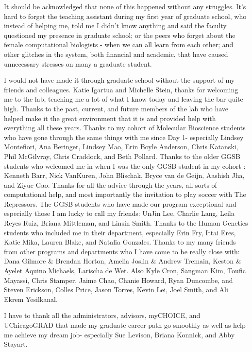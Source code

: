 It should be acknowledged that none of this happened without any struggles. It's hard to forget the teaching assistant during my first year of graduate school, who instead of helping me, told me I didn't know anything and said the faculty questioned my presence in graduate school; or the peers who forget about the female computational biologists - when we can all learn from each other; and other glitches in the system, both financial and academic, that have caused unnecessary stresses on many a graduate student.

I would not have made it through graduate school without the support of my friends and colleagues. Katie Igartua and Michelle Stein, thanks for welcoming me to the lab, teaching me a lot of what I know today and leaving the bar quite high. Thanks to the past, current, and future members of the lab who have helped make it the great environment that it is and provided help with everything all these years. Thanks to my cohort of Molecular Bioscience students who have gone through the same things with me since Day 1- especially Lindsey Montefiori, Ana Beringer, Lindsey Mao, Erin Boyle Anderson, Chris Katanski, Phil McGilvray, Chris Craddock, and Beth Pollard. Thanks to the older GGSB students who welcomed me in when I was the only GGSB student in my cohort : Kenneth Barr, Nick VanKuren, John Blischak, Bryce van de Geijn, Aashish Jha, and Ziyue Gao. Thanks for all the advice through the years, all sorts of computational help, and most importantly the invitation to play soccer with The Repressors. The GGSB students who have made our program exceptional and especially those I am lucky to call my friends: UnJin Lee, Charlie Lang, Leila Reyes Ruiz, Briana Mittleman, and Linsin Smith. Thanks to the Human Genetics students who included me in their department, especially Erin Fry, Ittai Eres, Katie Mika, Lauren Blake, and Natalia Gonzales. 
Thanks to my many friends from other programs and departments who I have come to be really close with: Dana Gilmore \& Brendan Horton, Amelia Joslin \& Andrew Tremain, Keston \& Ayelet Aquino Michaels, Larischa de Wet. Also Kyle Cron, Sangman Kim, Toufic Mayassi, Chris Stamper, Jaime Chao, Chanie Howard, Ryan Duncombe, and Steven Erickson, Colles Price, Jason Torres, Kevin Lei, Joel Smith, and Ali Ekrem Yesilkanal. 

I have to thank all the administrators, advisors, myCHOICE, and UChicagoGRAD that made my graduate career path go smoothly as well as help me achieve my dream job- especially Sue Levison, Briana Konnick, and Abby Stayart. 

